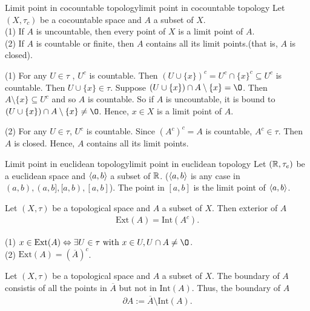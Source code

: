\begin{example}{Limit point in cocountable topology}{limit point in cocountable topology}
    Let $(X,\tau_c)$ be a cocountable space and $A$ a subset of $X$.\\
    (1) If $A$ is uncountable, then every point of $X$ is a limit point of $A$.\\
    (2) If $A$ is countable or finite, then $A$ contains all its limit points.(that is, $A$ is closed).
\end{example}
    (1) For any $U\in \tau$ , $U^c$ is countable. 
    Then $(U\cup \{x\})^c = U^c\cap \{x\}^c\subseteq U^c$ is countable. Then $U\cup \{x\}\in\tau$. 
    Suppose $(U\cup \{x\})\cap A\setminus \{x\} = \O$. Then $A\setminus \{x\}\subseteq U^c$ and so $A$ is countable.
    So if $A$ is uncountable, it is bound to $(U\cup \{x\})\cap A\setminus\{x\}\neq \O$. Hence, $x\in X$ is a limit point of $A$.
    \par
    (2) For any $U\in \tau$, $U^c$ is countable. Since $(A^c)^c=A$ is countable, $A^c\in\tau$. Then $A$ is closed.
    Hence, $A$ contains all its limit points.  




\begin{example}{Limit point in euclidean topology}{limit point in euclidean topology}
    Let $(\mathbb{R},\tau_e)$ be a euclidean space and $\langle a,b\rangle$ a subset of $\mathbb{R}$. ($\langle a,b\rangle$ is any case in 
    $(a,b),(a,b],[a,b),[a,b]$). The point in $[a,b]$ is the limit point of $\langle a,b\rangle$.
\end{example}



\begin{definition}{}{}
    Let $(X,\tau)$ be a topological space and $A$ a subset of $X$. 
    Then exterior of $A$
    \begin{align*}
        \text{Ext} (A) = \text{Int}(A^c).
    \end{align*}
\end{definition}


\begin{proposition}{}{}
    (1) $x\in \text{Ext}(A) \Leftrightarrow \exists U\in \tau\text{ with } x\in U, U\cap A\neq \O$.\\
    (2) $\text{Ext}(A) = (\overline{A})^c$.
\end{proposition}

\begin{definition}{}{}
    Let $(X,\tau)$ be a topological space and $A$ a subset of $X$. 
    The boundary of $A$ consistis of all the points in $\overline{A}$ but not in $\text{Int}(A)$. 
    Thus, the boundary of $A$ 
    \begin{align*}
        \partial A:=\overline{A}\setminus \text{Int}(A).  
    \end{align*}
\end{definition}
 
